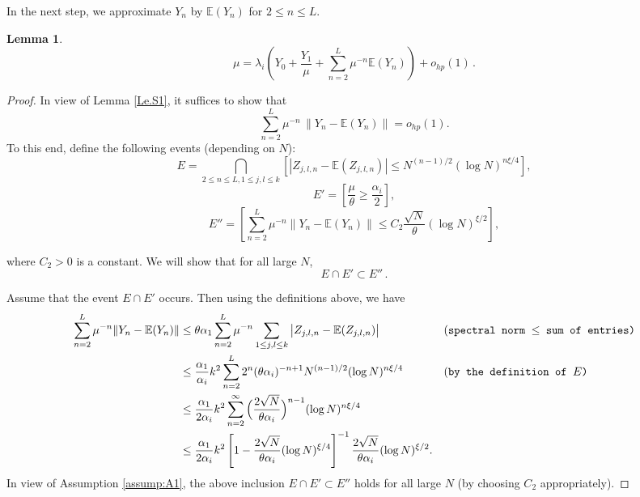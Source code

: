 \documentclass[11pt, reqno]{amsart}
\numberwithin{equation}{section}
\newtheorem{lemma}{Lemma}[section]
\newcommand{\E}{\mbox{${\mathbb E}$}}
\begin{document}
In the next step, we approximate $Y_n$ by $\E(Y_n)$ for $2\leq n \leq L$.

\begin{lemma}\label{Le.S2}
\[
\mu=\lambda_i\left(Y_0 + \frac{Y_1}{\mu} +  \sum_{n=2}^L\mu^{-n}\mathbb E(Y_n)\right)+o_{hp}(1)\,.
\]
\end{lemma}

\begin{proof}
In view of Lemma \ref{Le.S1}, it suffices to show that
\begin{equation}\label{Le.S2.Target}
\sum_{n=2}^L \mu^{-n}\,\|Y_n - \E(Y_n)\| = o_{hp}(1).
\end{equation}
To this end, define the following events (depending on $N$):
\[E = \bigcap_{2\le n\le L,1\le j,l\le k}\left[\left|Z_{j,l,n}-\mathbb E(Z_{j,l,n})\right|\le N^{(n-1)/2}(\log N)^{n\xi/4}\right],\] 
\[E' = \left[\frac{\mu}{\theta} \ge \frac{\alpha_i}{2} \right],\]
\[ E'' = \left[\sum_{n=2}^L\mu^{-n}\|Y_n-\mathbb E(Y_n)\|\le C_2\frac{\sqrt{N}}{\theta}(\log N)^{\xi/2}\right],\] 

where $C_2>0$ is a constant. We will show that for all large $N$,
\[E \cap E' \subset E''\,.\]

Assume that the event $E \cap E'$ occurs. Then using the definitions above, we have
\begin{align*}
\sum_{n=2}^L \mu^{-n}\|Y_n - \E(Y_n)\|
&\le \theta\alpha_1 \sum_{n=2}^L \mu^{-n} \sum_{1 \le j,l \le k} \big|Z_{j,l,n} - \E(Z_{j,l,n})\big|
&&\text{(\tt{spectral norm $\le$ sum of entries})}\\
&\le \frac{\alpha_1}{\alpha_i}k^2 \sum_{n=2}^L 2^n (\theta\alpha_i)^{-n+1} N^{(n-1)/2} (\log N)^{n\xi/4}
&&\text{(\tt{by the definition of $E$})}\\
&\le \frac{\alpha_1}{2\alpha_i}k^2 \sum_{n=2}^\infty \Big(\frac{2\sqrt{N}}{\theta\alpha_i}\Big)^{n-1} (\log N)^{n\xi/4} \\
&\le\frac{\alpha_1}{2\alpha_i}k^2 \left[1 - \frac{2\sqrt{N}}{\theta\alpha_i}(\log N)^{\xi/4}\right]^{-1} \frac{2\sqrt{N}}{\theta\alpha_i} (\log N)^{\xi/2}.
\end{align*}
In view of Assumption \ref{assump:A1}, the above inclusion $E\cap E' \subset E''$ holds for all large $N$ (by choosing $C_2$ appropriately).


\end{proof}
\end{document}
